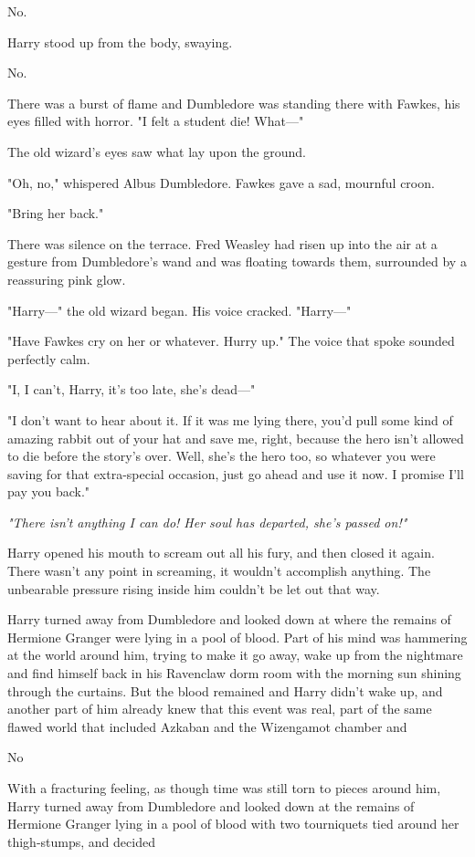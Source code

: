 No.

Harry stood up from the body, swaying.

No.

There was a burst of flame and Dumbledore was standing there with Fawkes, his 
eyes filled with horror. "I felt a student die! What---"

The old wizard's eyes saw what lay upon the ground.

"Oh, no," whispered Albus Dumbledore. Fawkes gave a sad, mournful croon.

"Bring her back."

There was silence on the terrace. Fred Weasley had risen up into the air at a 
gesture from Dumbledore's wand and was floating towards them, surrounded by a 
reassuring pink glow.

"Harry---" the old wizard began. His voice cracked. "Harry---"

"Have Fawkes cry on her or whatever. Hurry up." The voice that spoke sounded 
perfectly calm.

"I, I can't, Harry, it's too late, she's dead---"

"I don't want to hear about it. If it was me lying there, you'd pull some kind 
of amazing rabbit out of your hat and save me, right, because the hero isn't 
allowed to die before the story's over. Well, she's the hero too, so whatever 
you were saving for that extra-special occasion, just go ahead and use it now. 
I promise I'll pay you back."

\emph{"There isn't anything I can do! Her soul has departed, she's passed on!"}

Harry opened his mouth to scream out all his fury, and then closed it again. 
There wasn't any point in screaming, it wouldn't accomplish anything. The 
unbearable pressure rising inside him couldn't be let out that way.

Harry turned away from Dumbledore and looked down at where the remains of 
Hermione Granger were lying in a pool of blood. Part of his mind was hammering 
at the world around him, trying to make it go away, wake up from the nightmare 
and find himself back in his Ravenclaw dorm room with the morning sun shining 
through the curtains. But the blood remained and Harry didn't wake up, and 
another part of him already knew that this event was real, part of the same 
flawed world that included Azkaban and the Wizengamot chamber and

No

With a fracturing feeling, as though time was still torn to pieces around him, 
Harry turned away from Dumbledore and looked down at the remains of Hermione 
Granger lying in a pool of blood with two tourniquets tied around her 
thigh-stumps, and decided

